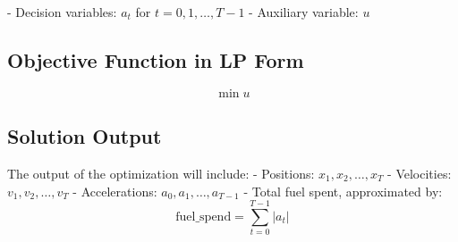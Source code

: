 \documentclass{article}
\begin{document}
- Decision variables: \( a_t \) for \( t = 0, 1, \ldots, T-1 \)
- Auxiliary variable: \( u \)

\subsection*{Objective Function in LP Form}

\[
\min u
\]

\subsection*{Solution Output}

The output of the optimization will include:
- Positions: \( x_1, x_2, \ldots, x_T \)
- Velocities: \( v_1, v_2, \ldots, v_T \)
- Accelerations: \( a_0, a_1, \ldots, a_{T-1} \)
- Total fuel spent, approximated by: 
  \[
  \text{fuel\_spend} = \sum_{t=0}^{T-1} |a_t|
  \]
\end{document}

